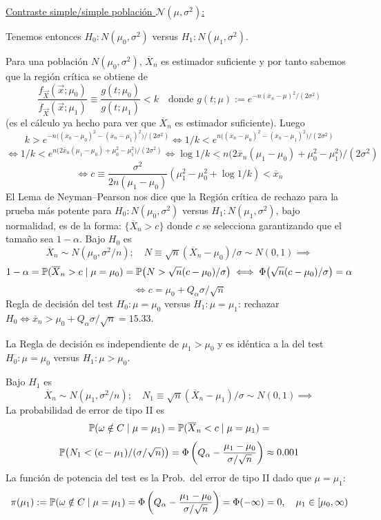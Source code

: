 \begin{enumerate}
    \noindent\underline{Contraste simple/simple población $\mathcal N(\mu, \sigma^2)$:}

    Tenemos entonces $H_0 : N(\mu_0, \sigma^2)$ versus $H_1 : N(\mu_1, \sigma^2)$.

    Para una población $N(\mu_0, \sigma^2)$, $\overline{X}_n$ es estimador suficiente y por tanto sabemos que la región crítica se obtiene de
    \[
      \frac{f_{\vec{X}}(\vec{x}; \mu_0)}{f_{\vec{X}}(\vec{x}; \mu_1)} \equiv \frac{g(t; \mu_0)}{g(t; \mu_1)} < k \quad \text{donde } g(t; \mu) := e^{-n(\overline{x}_n - \mu)^2/(2\sigma^2)}
    \]
  (es el cálculo ya hecho para ver que $\overline{X}_n$ es estimador suficiente). Luego
  \[
    k > e^{-n\bigl((\overline{x}_n - \mu_0)^2 - (\overline{x}_n - \mu_1)^2\bigr)/(2\sigma^2)} \iff 1/k < e^{n\bigl((\overline{x}_n - \mu_0)^2 - (\overline{x}_n - \mu_1)^2\bigr)/(2\sigma^2)}
  \]
  \[
    \iff 1/k < e^{n\bigl(2\overline{x}_n(\mu_1 - \mu_0) + \mu_0^2 - \mu_1^2\bigr)/(2\sigma^2)} \iff \log 1/k < n\bigl(2\overline{x}_n(\mu_1 - \mu_0) + \mu_0^2 - \mu_1^2\bigr)/(2\sigma^2)
  \]
  \[
    \iff c \equiv \frac{\sigma^2}{2n(\mu_1 - \mu_0)}\left(\mu_1^2 - \mu_0^2 + \log 1/k\right) < \overline{x}_n
  \]
  El Lema de Neyman--Pearson nos dice que la Región crítica de rechazo para la prueba más potente para $H_0 : N(\mu_0, \sigma^2)$ versus $H_1 : N(\mu_1, \sigma^2)$, bajo normalidad, es de la forma: $\{\overline{X}_n > c\}$ donde $c$ se selecciona garantizando que el tamaño sea $1 - \alpha$. Bajo $H_0$ es
  \[
    \overline{X}_n \sim N(\mu_0, \sigma^2/n); \quad N \equiv \sqrt{n}(\overline{X}_n - \mu_0)/\sigma \sim N(0, 1) \implies
  \]
  \[
    1 - \alpha = \mathbb{P}(\overline{X}_n > c \mid \mu = \mu_0) = \mathbb{P}\bigl(N > \sqrt{n}(c - \mu_0)/\sigma\bigr) \iff \Phi\bigl(\sqrt{n}(c - \mu_0)/\sigma\bigr) = \alpha
  \]
  \[
    \iff c = \mu_0 + Q_\alpha \sigma / \sqrt{n}
  \]
  Regla de decisión del test $H_0 : \mu = \mu_0$ versus $H_1 : \mu = \mu_1$:
  rechazar $H_0 \iff \overline{x}_n > \mu_0 + Q_\alpha \sigma / \sqrt{n} = 15.33$.

  \begin{observacion}[37]
    La Regla de decisión es independiente de $\mu_1 > \mu_0$ y es idéntica a la del test $H_0 : \mu = \mu_0$ versus $H_1 : \mu > \mu_0$.
  \end{observacion}

  Bajo $H_1$ es
  \[
    \overline{X}_n \sim N(\mu_1, \sigma^2/n); \quad N_1 \equiv \sqrt{n}(\overline{X}_n - \mu_1)/\sigma \sim N(0, 1) \implies
  \]
  La probabilidad de error de tipo II es
  \[
    \mathbb{P}(\omega \notin C \mid \mu = \mu_1) = \mathbb{P}(\overline{X}_n < c \mid \mu = \mu_1) =
  \]
  \[
    \mathbb{P}\bigl(N_1 < (c - \mu_1)/(\sigma/\sqrt{n})\bigr) = \Phi\left(Q_\alpha - \frac{\mu_1 - \mu_0}{\sigma/\sqrt{n}}\right) \approx 0.001
  \]
  La función de potencia del test es la Prob.\ del error de tipo II dado que $\mu = \mu_1$:
  \[
    \pi(\mu_1) := \mathbb{P}(\omega \notin C \mid \mu = \mu_1) = \Phi\left(Q_\alpha - \frac{\mu_1 - \mu_0}{\sigma/\sqrt{n}}\right) = \Phi(-\infty) = 0, \quad \mu_1 \in [\mu_0, \infty)
  \]


\end{enumerate}
